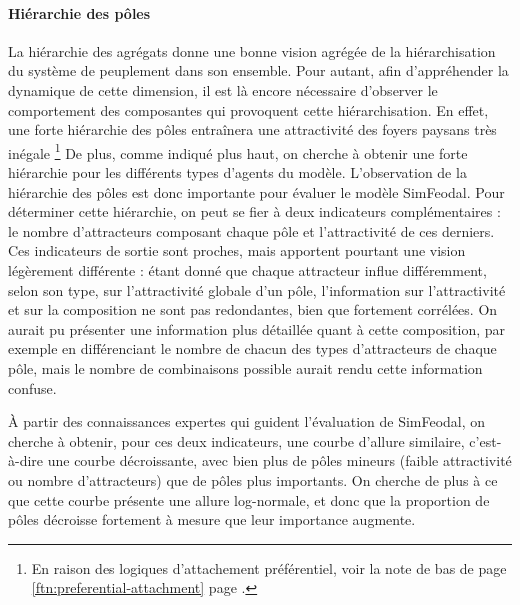 \paragraph{Hiérarchie des pôles}

La hiérarchie des agrégats donne une bonne vision agrégée de la hiérarchisation du système de peuplement dans son ensemble. Pour autant, afin d'appréhender la dynamique de cette dimension, il est là encore nécessaire d'observer le comportement des composantes qui provoquent cette hiérarchisation. En effet, une forte hiérarchie des pôles entraînera une attractivité des foyers paysans très inégale \footnote{En raison des logiques d'attachement préférentiel, voir la note de bas de page \ref{ftn:preferential-attachment} page \pageref{ftn:preferential-attachment}.} De plus, comme indiqué plus haut, on cherche à obtenir une forte hiérarchie pour les différents types d'agents du modèle. L'observation de la hiérarchie des pôles est donc importante pour évaluer le modèle SimFeodal.
Pour déterminer cette hiérarchie, on peut se fier à deux indicateurs complémentaires : le nombre d'attracteurs composant chaque pôle et l'attractivité de ces derniers. Ces indicateurs de sortie sont proches, mais apportent pourtant une vision légèrement différente : étant donné que chaque attracteur influe différemment, selon son type, sur l'attractivité globale d'un pôle, l'information sur l'attractivité et sur la composition ne sont pas redondantes, bien que fortement corrélées. On aurait pu présenter une information plus détaillée quant à cette composition, par exemple en différenciant le nombre de chacun des types d'attracteurs de chaque pôle, mais le nombre de combinaisons possible aurait rendu cette information confuse.

À partir des connaissances expertes qui guident l'évaluation de SimFeodal, on cherche à obtenir, pour ces deux indicateurs, une courbe d'allure similaire, c'est-à-dire une courbe décroissante, avec bien plus de pôles mineurs (faible attractivité ou nombre d'attracteurs) que de pôles plus importants. On cherche de plus à ce que cette courbe présente une allure log-normale, et donc que la proportion de pôles décroisse fortement à mesure que leur importance augmente.



